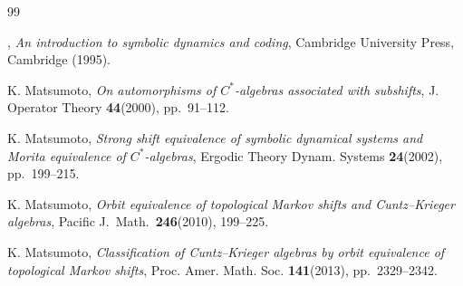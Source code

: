 \documentclass[11pt]{article}
\theoremstyle{plain}
\theoremstyle{definition}
\numberwithin{equation}{section}
\begin{document}
\begin{thebibliography}{99}



,
{\it An introduction to symbolic dynamics and coding},
 Cambridge University Press, Cambridge
(1995).









 {\sc K. Matsumoto},
{\it On automorphisms of $C^*$-algebras associated with subshifts},
J. Operator Theory {\bf 44}(2000), pp.\  91--112.

 {\sc K. Matsumoto},
{\it Strong shift equivalence of symbolic dynamical systems 
and Morita equivalence of $C^*$-algebras},
Ergodic Theory Dynam. Systems {\bf 24}(2002), pp.\ 199--215.


{\sc K. Matsumoto},
{\it Orbit equivalence of topological Markov shifts and Cuntz--Krieger algebras},
Pacific J.\ Math.\ 
{\bf 246}(2010), 199--225.













{\sc K. Matsumoto},
{\it  Classification of Cuntz--Krieger algebras by orbit equivalence of topological Markov shifts},
Proc. Amer. Math. Soc.
{\bf 141}(2013), pp.\ 2329--2342.





\end{thebibliography}
\end{document}
